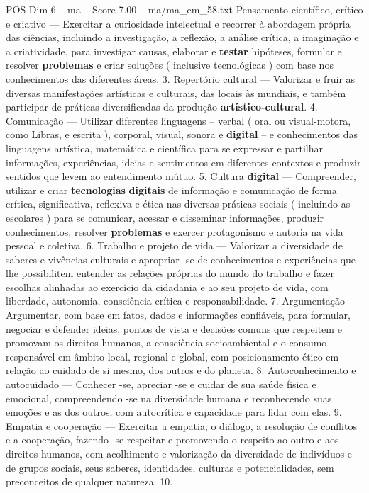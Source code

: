 \begin{textsample}{POS Dim 6 – ma – Score 7.00 – ma/ma\_em\_58.txt}
Pensamento científico, crítico e criativo — Exercitar a curiosidade intelectual e recorrer à abordagem própria das ciências, incluindo a investigação, a reflexão, a análise crítica, a imaginação e a criatividade, para investigar causas, elaborar e \textbf{testar} hipóteses, formular e resolver \textbf{problemas} e criar soluções ( inclusive tecnológicas ) com base nos conhecimentos das diferentes áreas. 3.
Repertório cultural — Valorizar e fruir as diversas manifestações artísticas e culturais, das locais às mundiais, e também participar de práticas diversificadas da produção \textbf{artístico-cultural}. 4.
Comunicação — Utilizar diferentes linguagens – verbal ( oral ou visual-motora, como Libras, e escrita ), corporal, visual, sonora e \textbf{digital} – e conhecimentos das linguagens artística, matemática e científica para se expressar e partilhar informações, experiências, ideias e sentimentos em diferentes contextos e produzir sentidos que levem ao entendimento mútuo. 5.
Cultura \textbf{digital} — Compreender, utilizar e criar \textbf{tecnologias} \textbf{digitais} de informação e comunicação de forma crítica, significativa, reflexiva e ética nas diversas práticas sociais ( incluindo as escolares ) para se comunicar, acessar e disseminar informações, produzir conhecimentos, resolver \textbf{problemas} e exercer protagonismo e autoria na vida pessoal e coletiva. 6.
Trabalho e projeto de vida — Valorizar a diversidade de saberes e vivências culturais e apropriar -se de conhecimentos e experiências que lhe possibilitem entender as relações próprias do mundo do trabalho e fazer escolhas alinhadas ao exercício da cidadania e ao seu projeto de vida, com liberdade, autonomia, consciência crítica e responsabilidade. 7.
Argumentação — Argumentar, com base em fatos, dados e informações confiáveis, para formular, negociar e defender ideias, pontos de vista e decisões comuns que respeitem e promovam os direitos humanos, a consciência socioambiental e o consumo responsável em âmbito local, regional e global, com posicionamento ético em relação ao cuidado de si mesmo, dos outros e do planeta. 8.
Autoconhecimento e autocuidado — Conhecer -se, apreciar -se e cuidar de sua saúde física e emocional, compreendendo -se na diversidade humana e reconhecendo suas emoções e as dos outros, com autocrítica e capacidade para lidar com elas. 9.
Empatia e cooperação — Exercitar a empatia, o diálogo, a resolução de conflitos e a cooperação, fazendo -se respeitar e promovendo o respeito ao outro e aos direitos humanos, com acolhimento e valorização da diversidade de indivíduos e de grupos sociais, seus saberes, identidades, culturas e potencialidades, sem preconceitos de qualquer natureza. 10.

\end{textsample}
